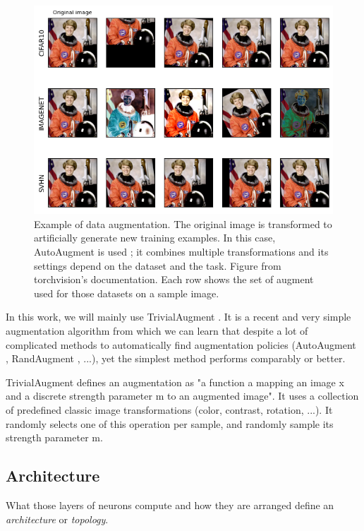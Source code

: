 \begin{figure}
    \centering
    \includegraphics[width=\columnwidth]{70-files/autoaugment.png}
    \caption{Example of data augmentation. The original image is transformed to artificially generate new training examples. In this case, AutoAugment is used ; it combines multiple transformations and its settings depend on the dataset and the task. Figure from torchvision's documentation. Each row shows the set of augment used for those datasets on a sample image.}
    \label{fig:autoaugment}
\end{figure}

In this work, we will mainly use TrivialAugment \cite{trivialaugment}. It is a recent and very simple augmentation algorithm from which we can learn that despite a lot of complicated methods to automatically find augmentation policies (AutoAugment \cite{autoaugment}, RandAugment \cite{randaugment}, ...), yet the simplest method performs comparably or better.

TrivialAugment defines an augmentation as "a function a mapping an image x and a discrete strength parameter m to an augmented image". It uses a collection of predefined classic image transformations (color, contrast, rotation, ...). It randomly selects one of this operation per sample, and randomly sample its strength parameter m.

\subsection{Architecture}

What those layers of neurons compute and how they are arranged define an \emph{architecture} or \emph{topology}.

